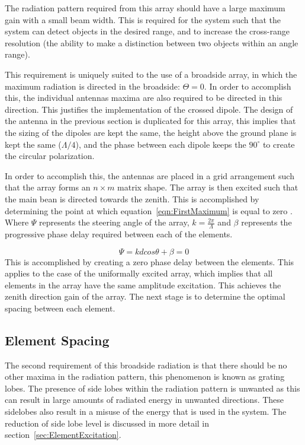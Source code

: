 \documentclass[11pt]{witseiepaper}
\begin{document}
The radiation pattern required from this array should have a large maximum gain with a small beam width. This is required for the system such that the system can detect objects in the desired range, and to increase the cross-range resolution (the ability to make a distinction between two objects within an angle range).

This requirement is uniquely suited to the use of a broadside array, in which the maximum radiation is directed in the broadside: $\Theta = 0$.
In order to accomplish this, the individual antennas maxima are also required to be directed in this direction. This justifies the implementation of the crossed dipole.
The design of the antenna in the previous section is duplicated for this array, this implies that the sizing of the dipoles are kept the same, the height above the ground plane is kept the same ($\Lambda /4$), and the phase between each dipole keeps the $90^{\circ}$ to create the circular polarization.


In order to accomplish this, the antennas are placed in a grid arrangement such that the array forms an $n \times m$ matrix shape.
The array is then excited such that the main bean is directed towards the zenith. This is accomplished by determining the point at which equation~\ref{eqn:FirstMaximum}
is equal to zero \cite[p.~296]{Balanis}. Where $\Psi$ represents the steering angle of the array, $k = \frac{2 \pi}{\Lambda}$ and $\beta$ represents the progressive phase delay required between each of the elements.

\begin{equation} \label{eqn:FirstMaximum}
\Psi = k d cos \theta + \beta = 0
\end{equation}
This is accomplished by creating a zero phase delay between the elements. This applies to the case of the uniformally excited array, which implies that all elements in the array have the same amplitude excitation.
This achieves the zenith direction gain of the array. The next stage is to determine the optimal spacing between each element.


\subsection{Element Spacing} \label{sec:ElementSpacing}
The second requirement of this broadside radiation is that there should be no other maxima in the radiation pattern, this phenomenon is known as grating lobes.
The presence of side lobes within the radiation pattern is unwanted as this can result in large amounts of radiated energy in unwanted directions. These sidelobes also result in a misuse of the energy that is used in the system.
The reduction of side lobe level is discussed in more detail in section~\ref{sec:ElementExcitation}.
\end{document}
